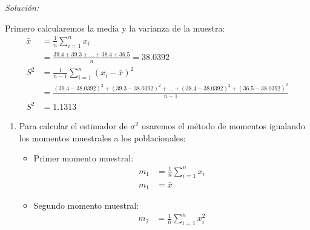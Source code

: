 \documentclass[12pt]{article}
\newenvironment{sol}
    {\emph{Solución:}
    }
    {
    }
\begin{document}
\begin{sol}
Primero calcularemos la media y la varianza de la muestra:
\begin{align*}
\bar{x} &= \frac{1}{n}\sum_{i=1}^n x_i \\
&= \frac{39.4+39.3+...+38.4+36.5}{n}=38.0392 \\
S^2 &= \frac{1}{n-1} \sum_{i=1}^{n} (x_i - \bar{x})^2 \\
&=\frac{(39.4-38.0392)^2 + (39.3-38.0392)^2 +...+(38.4-38.0392)^2 +(36.5-38.0392)^2 }{n-1}\\
S^2 &=1.1313 
\end{align*}

\begin{enumerate}[label=\alph*)] %
    \item Para calcular el estimador de $\sigma^2$ usaremos el método de momentos igualando los momentos muestrales a los poblacionales:
    \begin{itemize}

\item Primer momento muestral:
\begin{align*}
m_1&=\frac{1}{n}\sum_{i=1}^nx_i\\
m_1&=\bar{x}
\end{align*}

\item Segundo momento muestral:
\begin{align*}
m_2 &= \frac{1}{n}\sum_{i=1}^nx_i^2
\end{align*}

\pagebreak
    

\end{itemize}
\end{enumerate}
\end{sol}
\end{document}
